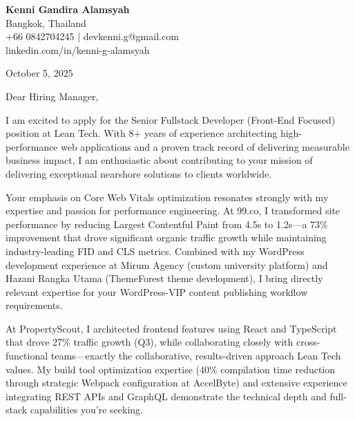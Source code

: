 \documentclass[11pt,a4paper]{article}
\begin{document}
\begin{flushleft}
\textbf{\Large Kenni Gandira Alamsyah}\\
Bangkok, Thailand\\
+66 0842704245 | devkenni.g@gmail.com\\
linkedin.com/in/kenni-g-alamsyah
\end{flushleft}

\vspace{1em}

October 5, 2025

\vspace{1em}

Dear Hiring Manager,

\vspace{1em}

I am excited to apply for the Senior Fullstack Developer (Front-End Focused) position at Lean Tech. With 8+ years of experience architecting high-performance web applications and a proven track record of delivering measurable business impact, I am enthusiastic about contributing to your mission of delivering exceptional nearshore solutions to clients worldwide.

\vspace{1em}

Your emphasis on Core Web Vitals optimization resonates strongly with my expertise and passion for performance engineering. At 99.co, I transformed site performance by reducing Largest Contentful Paint from 4.5s to 1.2s---a 73\% improvement that drove significant organic traffic growth while maintaining industry-leading FID and CLS metrics. Combined with my WordPress development experience at Mirum Agency (custom university platform) and Hazani Rangka Utama (ThemeForest theme development), I bring directly relevant expertise for your WordPress-VIP content publishing workflow requirements.

\vspace{1em}

At PropertyScout, I architected frontend features using React and TypeScript that drove 27\% traffic growth (Q3), while collaborating closely with cross-functional teams---exactly the collaborative, results-driven approach Lean Tech values. My build tool optimization expertise (40\% compilation time reduction through strategic Webpack configuration at AccelByte) and extensive experience integrating REST APIs and GraphQL demonstrate the technical depth and full-stack capabilities you're seeking.

\vspace{1em}
\end{document}
